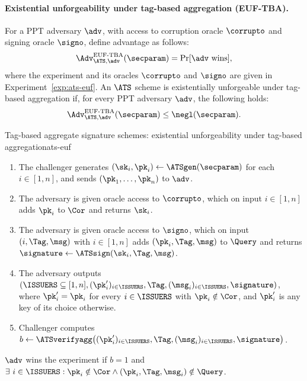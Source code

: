 \paragraph{Existential unforgeability under tag-based aggregation (EUF-TBA).}
For a PPT
adversary $\adv$, with access to corruption oracle $\corrupto$ and signing
oracle $\signo$, define advantage as follows:
%
\begin{equation*}
%
  \Adv_{\ATS, \adv}^{\text{EUF-TBA}}(\secparam) = \Pr[\adv \text{
wins}],
%
\end{equation*}
%
where the experiment and its oracles $\corrupto$ and $\signo$ are given in
Experiment~\ref{exp:ats-euf}. An $\ATS$
scheme is existentially unforgeable under tag-based aggregation if, for every
PPT adversary $\adv$, the following holds:
%
\begin{equation*}
%
  \Adv_{\ATS, \adv}^{\text{EUF-TBA}}(\secparam) \leq
\negl(\secparam).
%
\end{equation*}

\begin{experimentbox}{Tag-based aggregate signature schemes: existential unforgeability under tag-based aggregation}{ats-euf}

  \begin{enumerate}

    \item The challenger generates $(\sk_i, \pk_i) \gets \ATSgen(\secparam)$ for
each $i \in [1,n]$, and sends $(\pk_1, \ldots, \pk_n)$ to $\adv$.

    \item The adversary is given oracle access to $\corrupto$, which on input $i
\in [1,n]$ adds $\pk_i$ to $\Cor$ and returns $\sk_i$.

    \item The adversary is given oracle access to $\signo$, which on input $(i,
\Tag, \msg)$ with $i \in [1,n]$ adds $(\pk_i, \Tag, \msg)$ to $\Query$ and
returns $\signature \gets \ATSsign(\sk_i, \Tag, \msg)$.

    \item The adversary outputs $(\ISSUERS \subseteq [1, n], (\pk'_i)_{i \in
\ISSUERS}, \Tag, (\msg_i)_{i \in \ISSUERS}, \signature)$, where $\pk'_i =
\pk_i$ for every $i \in \ISSUERS$ with $\pk_i \notin \Cor$, and $\pk'_i$ is any
key of its choice otherwise.

    \item Challenger computes $b \gets \ATSverifyagg\bigl((\pk'_i)_{i \in
\ISSUERS}, \Tag, (\msg_i)_{i \in \ISSUERS}, \signature\bigr)$.

  \end{enumerate}

  $\adv$ wins the experiment if $b = 1$ and $\exists \ i \in \ISSUERS : \pk_i
\notin \Cor \wedge (\pk_i, \Tag, \msg_i) \notin \Query$.

\end{experimentbox}


